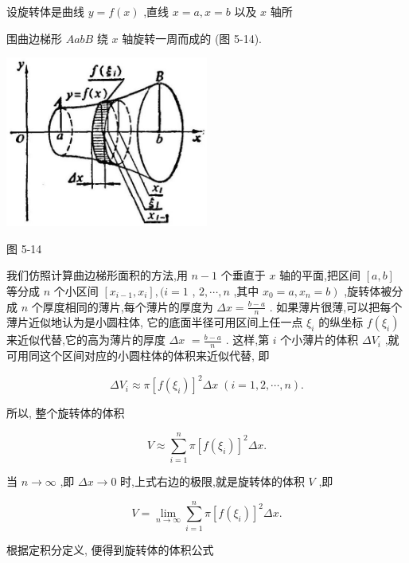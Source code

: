 \documentclass[lang=cn,newtx,12pt,scheme=chinese]{elegantbook}
\begin{document}
设旋转体是曲线 \(y = f\left( x\right)\) ,直线 \(x = a,x = b\) 以及 \(x\) 轴所

围曲边梯形 \({AabB}\) 绕 \(x\) 轴旋转一周而成的 (图 5-14).

\begin{center}
\includegraphics[max width=0.5\textwidth]{images/01912c18-5c3f-733d-b775-749ba9897a9d_236_380755.jpg}
\end{center}

图 5-14

我们仿照计算曲边梯形面积的方法,用 \(n - 1\) 个垂直于 \(x\) 轴的平面,把区间 \(\left\lbrack {a,b}\right\rbrack\) 等分成 \(n\) 个小区间 \(\left\lbrack {{x}_{i - 1},{x}_{i}}\right\rbrack ,(i = 1\) , \(2,\cdots ,n\) ,其中 \(\left. {{x}_{0} = a,{x}_{n} = b}\right)\) ,旋转体被分成 \(n\) 个厚度相同的薄片,每个薄片的厚度为 \({\Delta x} = \frac{b - a}{n}\) . 如果薄片很薄,可以把每个薄片近似地认为是小圆柱体, 它的底面半径可用区间上任一点 \({\xi }_{i}\) 的纵坐标 \(f\left( {\xi }_{i}\right)\) 来近似代替,它的高为薄片的厚度 \({\Delta x}\) \(= \frac{b - a}{n}\) . 这样,第 \(i\) 个小薄片的体积 \(\Delta {V}_{i}\) ,就可用同这个区间对应的小圆柱体的体积来近似代替, 即

\[
\Delta {V}_{i} \approx \pi {\left\lbrack f\left( {\xi }_{i}\right) \right\rbrack }^{2}{\Delta x}\;\left( {i = 1,2,\cdots ,n}\right) .
\]

所以, 整个旋转体的体积

\[
V \approx \mathop{\sum }\limits_{{i = 1}}^{n}\pi {\left\lbrack f\left( {\xi }_{i}\right) \right\rbrack }^{2}{\Delta x}.
\]

当 \(n \rightarrow \infty\) ,即 \({\Delta x} \rightarrow 0\) 时,上式右边的极限,就是旋转体的体积 \(V\) ,即

\[
V = \mathop{\lim }\limits_{{n \rightarrow \infty }}\mathop{\sum }\limits_{{i = 1}}^{n}\pi {\left\lbrack f\left( {\xi }_{i}\right) \right\rbrack }^{2}{\Delta x}.
\]

根据定积分定义, 便得到旋转体的体积公式
\end{document}
